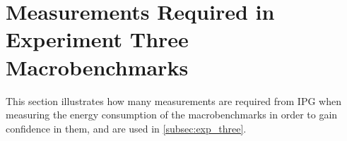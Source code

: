 \section{Measurements Required in Experiment Three Macrobenchmarks}\label{app:exp_three_coch_app}

This section illustrates how many measurements are required from IPG when measuring the energy consumption of the macrobenchmarks in order to gain confidence in them, and are used in \cref{subsec:exp_three}.


